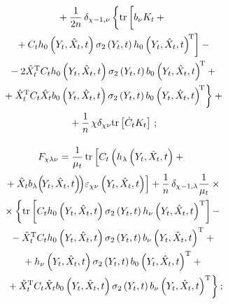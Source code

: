 \begin{multicols}{2}
    \noindent
    \begin{multline*}
{}+\fr{1}{2n}\,
    \delta_{\chi-1,\nu} \left\{
    \mathrm{tr} \left[ 
        \vphantom{b_0 \left(Y_t,\hat X_t,t\right)^{\!\mathrm{T}}}
        b_\nu K_t+{}\right.\right.\\
\left.  {}+ C_th_0 \left(Y_t,\hat
    X_t,t\right)\sigma_2 \left(Y_t,t\right) h_0
    \left(Y_t,\hat X_t,t\right)^{\!\mathrm{T}}\right]-{}\\
{}-2\hat X_t^{\mathrm{T}} C_t h_0 \left(Y_t,\hat X_t,t\right)\sigma_2 
\left(Y_t,t\right) 
b_0\left(Y_t,\hat X_t,t\right)^{\!\mathrm{T}}+{}\\
\left.{}+\hat X_t^{\mathrm{T}} C_t\hat X_t b_0\left(Y_t,\hat X_t,t\right)
\sigma_2\left(Y_t,t\right) b_0 \left(Y_t,\hat X_t,t\right)^{\!\mathrm{T}}\right\}+{}\\
{}+
\fr{1}{n} \, \chi\delta_{\chi\nu} \mathrm{tr} \left[ \dot C_t K_t\right]\,;
\end{multline*}

\vspace*{-14pt}

\noindent
\begin{multline*}
F_{\chi \lambda \nu} = \fr{1}{\mu_t}\,\mathrm{tr} \left[ 
\vphantom{\hat X_t  b_\lambda \!\left(\!Y_t,\hat X_t,t\right)}
C_t\left(
h_\lambda \left(Y_t,\hat X_t,t\right) +{}\right.\right.\\
\left.\left.\!{}+
\hat X_t  b_\lambda \!\left(\!Y_t,\hat X_t,t\right)\!\right)\! \varepsilon_{\chi \nu}
    \left(Y_t,\hat X_t,t\right) \right]+\fr{1}{n}\,\delta_{\chi-1,\lambda} \fr{1}{\mu_t}\times{}\\
{}\times\left\{
    \mathrm{tr}\left[ C_t h_0 \left(Y_t,\hat X_t,t\right) 
    \sigma_2 \left(Y_t,t\right) h_\nu \left(Y_t,\hat X_t,t\right)^{\mathrm{T}}\right] -\right.{}\\
{}-\hat X_t^{\mathrm{T}} C_t
h_0 \left(Y_t,\hat X_t,t\right)\sigma_2 
\left(Y_t,t\right) b_\nu  \left(Y_t,\hat X_t,t\right)^{\mathrm{T}}+{}\\
    {}+ h_\nu \left(Y_t,\hat X_t,t\right)\sigma_2 \left(Y_t,t\right) b_0 \left(Y_t,\hat
    X_t,t\right)^{\mathrm{T}} +{}\\
\left.{}+\hat X_t^{\mathrm{T}} C_t\hat X_t b_0 \left(Y_t,\hat X_t,t\right) 
\sigma_2 \left(Y_t,t\right) 
b_\nu \left(Y_t,\hat X_t,t\right)^{\mathrm{T}}\right\};\hspace*{-2.70535pt}
\end{multline*}

\vspace*{-14pt}


\end{multicols}
